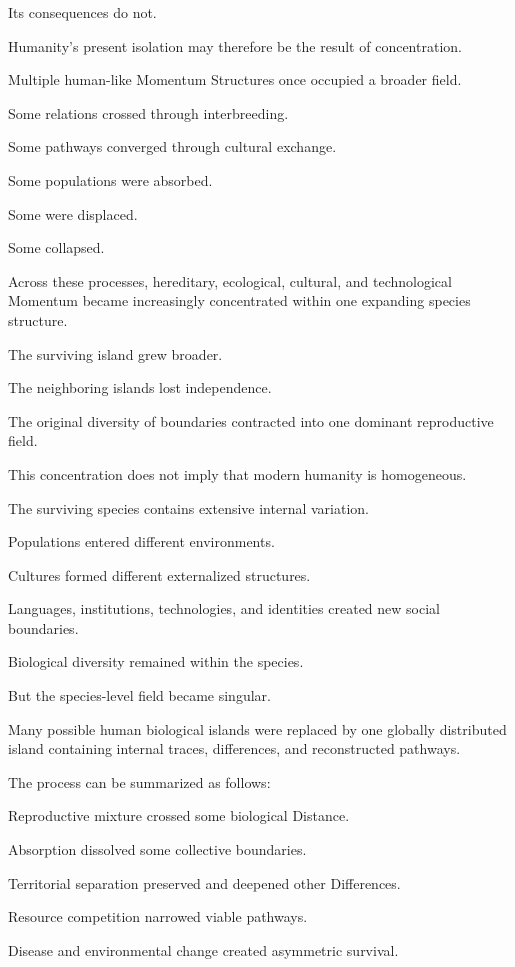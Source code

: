 Its consequences do not.

Humanity’s present isolation may therefore be the result of concentration.

Multiple human-like Momentum Structures once occupied a broader field.

Some relations crossed through interbreeding.

Some pathways converged through cultural exchange.

Some populations were absorbed.

Some were displaced.

Some collapsed.

Across these processes, hereditary, ecological, cultural, and technological Momentum became increasingly concentrated within one expanding species structure.

The surviving island grew broader.

The neighboring islands lost independence.

The original diversity of boundaries contracted into one dominant reproductive field.

This concentration does not imply that modern humanity is homogeneous.

The surviving species contains extensive internal variation.

Populations entered different environments.

Cultures formed different externalized structures.

Languages, institutions, technologies, and identities created new social boundaries.

Biological diversity remained within the species.

But the species-level field became singular.

Many possible human biological islands were replaced by one globally distributed island containing internal traces, differences, and reconstructed pathways.

The process can be summarized as follows:

Reproductive mixture crossed some biological Distance.

Absorption dissolved some collective boundaries.

Territorial separation preserved and deepened other Differences.

Resource competition narrowed viable pathways.

Disease and environmental change created asymmetric survival.


